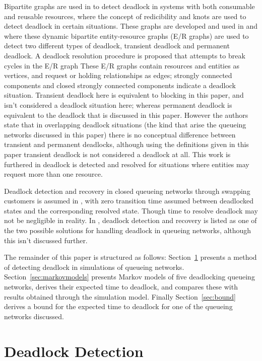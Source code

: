 \documentclass{article}
\numberwithin{equation}{section}
\begin{document}
Bipartite graphs are used in \cite{holt72} to detect deadlock in systems with both consumable and reusable resources, where the concept of redicibility and knots are used to detect deadlock in certain situations.
These graphs are developed and used in \cite{deuermeyeretal97} and \cite{venkateshsmith03}where these dynamic bipartite entity-resource graphs (E/R graphs) are used to detect two different types of deadlock, transient deadlock and permanent deadlock. A deadlock resolution procedure is proposed that attempts to break cycles in the E/R graph
These E/R graphs contain resources and entities as vertices, and request or holding relationships as edges; strongly connected components and closed strongly connected components indicate a deadlock situation.
Transient deadlock here is equivalent to blocking in this paper, and isn't considered a deadlock situation here; whereas permanent deadlock is equivalent to the deadlock that is discussed in this paper.
However the authors state that in overlapping deadlock situations (the kind that arise the queueing networks discussed in this paper) there is no conceptual difference between transient and permanent deadlocks, although using the definitions given in this paper transient deadlock is not considered a deadlock at all.
This work is furthered in \cite{venkateshetal98} deadlock is detected and resolved for situations where entities may request more than one resource.

Deadlock detection and recovery in closed queueing networks through swapping customers is assumed in \cite{perrosetal88}, with zero transition time assumed between deadlocked states and the corresponding resolved state. Though time to resolve deadlock may not be negligible in reality.
In \cite{akyildiz89}, deadlock detection and recovery is listed as one of the two possible solutions for handling deadlock in queueing networks, although this isn't discussed further.


The remainder of this paper is structured as follows: Section~\ref{sec:detectingdeadlock} presents a method of detecting deadlock in simulations of queueing networks. Section~\ref{sec:markovmodels} presents Markov models of five deadlocking queueing networks, derives their expected time to deadlock, and compares these with results obtained through the simulation model. Finally Section~\ref{sec:bound} derives a bound for the expected time to deadlock for one of the queueing networks discussed.


\section{Deadlock Detection}\label{sec:detectingdeadlock}
\end{document}
